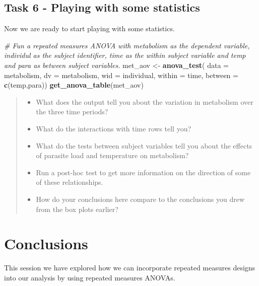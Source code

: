 \documentclass[
]{book}
\newenvironment{Shaded}{\begin{snugshade}}{\end{snugshade}}
\newcommand{\AttributeTok}[1]{\textcolor[rgb]{0.13,0.29,0.53}{#1}}
\newcommand{\CommentTok}[1]{\textcolor[rgb]{0.56,0.35,0.01}{\textit{#1}}}
\newcommand{\FunctionTok}[1]{\textcolor[rgb]{0.13,0.29,0.53}{\textbf{#1}}}
\newcommand{\NormalTok}[1]{#1}
\newcommand{\OtherTok}[1]{\textcolor[rgb]{0.56,0.35,0.01}{#1}}
\providecommand{\tightlist}{%
  \setlength{\itemsep}{0pt}\setlength{\parskip}{0pt}}
\begin{document}
\hypertarget{task-6---playing-with-some-statistics}{%
\subsection{Task 6 - Playing with some statistics}\label{task-6---playing-with-some-statistics}}

Now we are ready to start playing with some statistics.

\begin{Shaded}
\begin{Highlighting}[]
\CommentTok{\# Fun a repeated measures ANOVA with metabolism as the dependent variable, individul as the subject identifier, time as the within subject variable and temp and para as between subject variables.}
\NormalTok{met\_aov }\OtherTok{\textless{}{-}} \FunctionTok{anova\_test}\NormalTok{(}
  \AttributeTok{data =}\NormalTok{ metabolism, }\AttributeTok{dv =}\NormalTok{ metabolism, }\AttributeTok{wid =}\NormalTok{ individual,}
  \AttributeTok{within =}\NormalTok{  time, }\AttributeTok{between =} \FunctionTok{c}\NormalTok{(temp,para))}
\FunctionTok{get\_anova\_table}\NormalTok{(met\_aov)}
\end{Highlighting}
\end{Shaded}

\begin{quote}
\begin{itemize}
\tightlist
\item
  What does the output tell you about the variation in metabolism over the three time periods?
\item
  What do the interactions with time rows tell you?
\item
  What do the tests between subject variables tell you about the effects of parasite load and temperature on metabolism?
\item
  Run a post-hoc test to get more information on the direction of some of these relationships.
\item
  How do your conclusions here compare to the conclusions you drew from the box plots earlier?
\end{itemize}
\end{quote}

\hypertarget{conclusions-1}{%
\section{Conclusions}\label{conclusions-1}}

This session we have explored how we can incorporate repeated measures designs into our analysis by using repeated measures ANOVAs.
\end{document}
